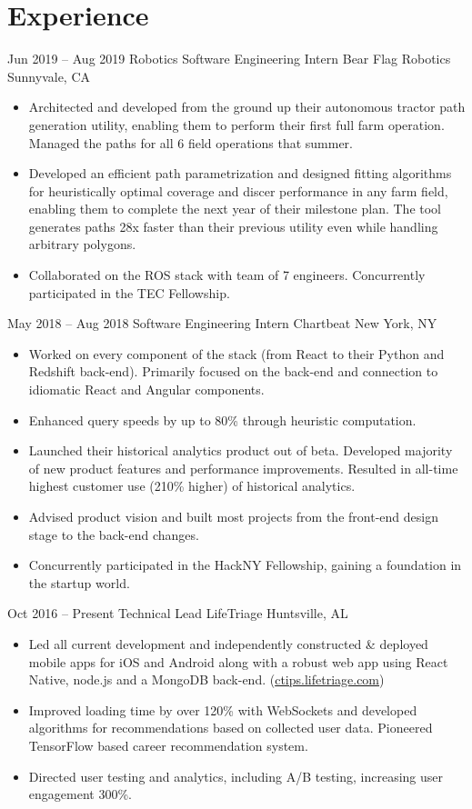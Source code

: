 \documentclass[letterpaper]{moderncv}        %
\begin{document}
\section{Experience}
\cventry
{Jun 2019 -- Aug 2019}
{Robotics Software Engineering Intern}
{Bear Flag Robotics}
{Sunnyvale, CA}
{}
{\begin{itemize}%
	\item Architected and developed from the ground up their autonomous tractor path generation utility, enabling them to perform their first full farm operation. Managed the paths for all 6 field operations that summer.
	\item Developed an efficient path parametrization and designed fitting algorithms for heuristically optimal coverage and discer performance in any farm field, enabling them to complete the next year of their milestone plan. The tool generates paths 28x faster than their previous utility even while handling arbitrary polygons.
	\item Collaborated on the ROS stack with team of 7 engineers. Concurrently participated in the TEC Fellowship.
	\end{itemize}}
\cventry
{May 2018 -- Aug 2018}
{Software Engineering Intern}
{Chartbeat}
{New York, NY}
{}
{\begin{itemize}%
	\item Worked on every component of the stack (from React to their Python and Redshift back-end). Primarily focused on the back-end and connection to idiomatic React and Angular components.
	\item Enhanced query speeds by up to 80\% through heuristic computation.
	\item Launched their historical analytics product out of beta. Developed majority of new product features and performance improvements. Resulted in all-time highest customer use (210\% higher) of historical analytics.
	\item Advised product vision and built most projects from the front-end design stage to the back-end changes.
	\item Concurrently participated in the HackNY Fellowship, gaining a foundation in the startup world.
	\end{itemize}}
\cventry
{Oct 2016 -- Present}
{Technical Lead}
{LifeTriage}
{Huntsville, AL}
{}
{\begin{itemize}%
	\item Led all current development and independently constructed \& deployed mobile apps for iOS and Android along with a robust web app using React Native, node.js and a MongoDB back-end. (\href{https://ctips.lifetriage.com}{ctips.lifetriage.com})
	\item Improved loading time by over 120\% with WebSockets and developed algorithms for recommendations based on collected user data. Pioneered TensorFlow based career recommendation system.
	\item Directed user testing and analytics, including A/B testing, increasing user engagement 300\%.
	\end{itemize}}
\end{document}
